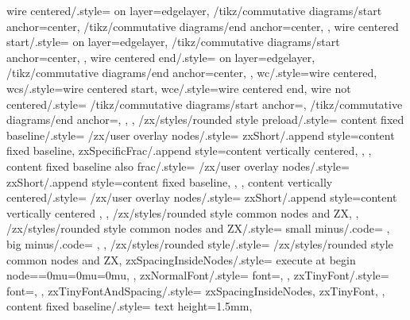 {{    %
    wire centered/.style={
      on layer=edgelayer,
      /tikz/commutative diagrams/start anchor=center,
      /tikz/commutative diagrams/end anchor=center,
    },
    wire centered start/.style={
      on layer=edgelayer,
      /tikz/commutative diagrams/start anchor=center,
    },
    wire centered end/.style={
      on layer=edgelayer,
      /tikz/commutative diagrams/end anchor=center,
    },
    wc/.style={wire centered},
    wcs/.style={wire centered start},
    wce/.style={wire centered end},
    wire not centered/.style={
      /tikz/commutative diagrams/start anchor=,
      /tikz/commutative diagrams/end anchor=,
    },
  },
  /zx/styles/rounded style preload/.style={
    content fixed baseline/.style={
      /zx/user overlay nodes/.style={
        zxShort/.append style={content fixed baseline},
        zxSpecificFrac/.append style={content vertically centered},
      },
    },
    content fixed baseline also frac/.style={
      /zx/user overlay nodes/.style={
        zxShort/.append style={content fixed baseline},
      },
    },
    content vertically centered/.style={
      /zx/user overlay nodes/.style={
        zxShort/.append style={content vertically centered}
      },
    },
    /zx/styles/rounded style common nodes and ZX,
  },
  /zx/styles/rounded style common nodes and ZX/.style={
    small minus/.code={
      \def\zxMinus{\zxShortMinus}%
      \def\zxMinusInShort{\zxShortMinus}%
    },
    big minus/.code={
      \def\zxMinus{-}%
      \def\zxMinusInShort{-}%
    },
  },
  /zx/styles/rounded style/.style={
    /zx/styles/rounded style common nodes and ZX,
    zxSpacingInsideNodes/.style={
      execute at begin node={\thinmuskip=0mu\medmuskip=0mu\thickmuskip=0mu}, %
    },
    zxNormalFont/.style={
      font={\fontsize{10}{12}\selectfont},
    },
    zxTinyFont/.style={
      font={\fontsize{6}{6}\selectfont},
    },
    zxTinyFontAndSpacing/.style={
      zxSpacingInsideNodes,
      zxTinyFont,
    },
    content fixed baseline/.style={
      text height=1.5mm,%
}}}
